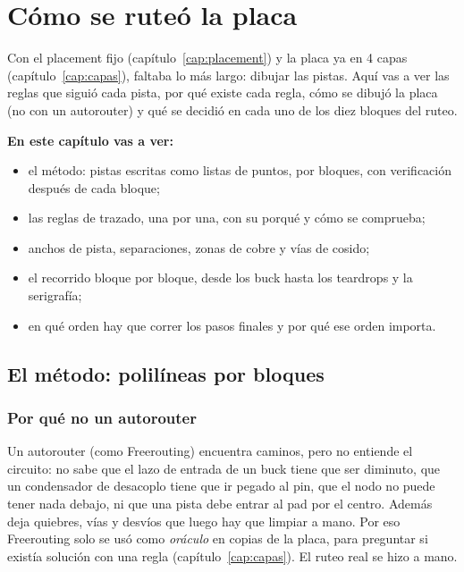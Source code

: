 \chapter{Cómo se ruteó la placa}\label{cap:ruteo}


Con el placement fijo (capítulo~\ref{cap:placement}) y la placa ya en 4 capas (capítulo~\ref{cap:capas}), faltaba
lo más largo: dibujar las pistas. Aquí vas a ver las reglas que siguió cada pista, por qué existe cada regla, cómo se
dibujó la placa (no con un autorouter) y qué se decidió en cada uno de los diez bloques del ruteo.

\textbf{En este capítulo vas a ver:}
\begin{itemize}
  \item el método: pistas escritas como listas de puntos, por bloques, con verificación después de cada bloque;
  \item las reglas de trazado, una por una, con su porqué y cómo se comprueba;
  \item anchos de pista, separaciones, zonas de cobre y vías de cosido;
  \item el recorrido bloque por bloque, desde los buck hasta los teardrops y la serigrafía;
  \item en qué orden hay que correr los pasos finales y por qué ese orden importa.
\end{itemize}

\section{El método: polilíneas por bloques}\label{sec:c09-metodo}

\subsection{Por qué no un autorouter}

Un autorouter (como Freerouting) encuentra caminos, pero no entiende el circuito: no sabe que el lazo de entrada de un
buck tiene que ser diminuto, que un condensador de desacoplo tiene que ir pegado al pin, que el nodo  no
puede tener nada debajo, ni que una pista debe entrar al pad por el centro. Además deja quiebres, vías y desvíos que
luego hay que limpiar a mano. Por eso Freerouting solo se usó como \emph{oráculo} en copias de la placa, para
preguntar si existía solución con una regla (capítulo~\ref{cap:capas}). El ruteo real se hizo a mano.

